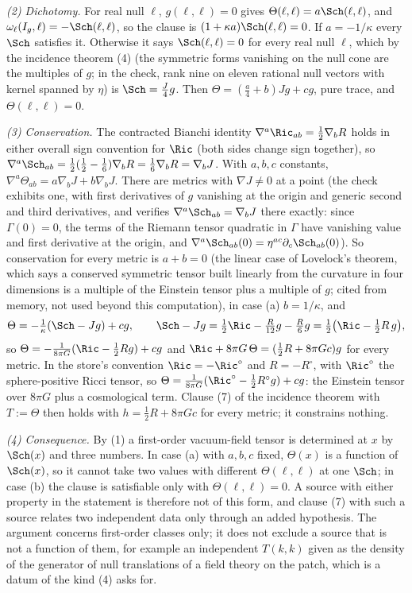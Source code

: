 \emph{(2) Dichotomy.} For real null $\ell$, $g(\ell,\ell) = 0$ gives $\Theta(\ell,\ell) = a\Sch(\ell,\ell)$, and $\omega_\ell(I_g,\ell) = -\Sch(\ell,\ell)$, so the clause is $(1 + \kappa a)\Sch(\ell,\ell) = 0$. If $a = -1/\kappa$ every $\Sch$ satisfies it. Otherwise it says $\Sch(\ell,\ell) = 0$ for every real null $\ell$, which by the incidence theorem (4) (the symmetric forms vanishing on the null cone are the multiples of $g$; in the check, rank nine on eleven rational null vectors with kernel spanned by $\eta$) is $\Sch = \tfrac{J}{4}g$. Then $\Theta = (\tfrac{a}{4} + b)Jg + cg$, pure trace, and $\Theta(\ell,\ell) = 0$.

\emph{(3) Conservation.} The contracted Bianchi identity $\nabla^a\Ric_{ab} = \tfrac12\nabla_b R$ holds in either overall sign convention for $\Ric$ (both sides change sign together), so $\nabla^a\Sch_{ab} = \tfrac12(\tfrac12 - \tfrac16)\nabla_b R = \tfrac16\nabla_b R = \nabla_b J$. With $a, b, c$ constants, $\nabla^a\Theta_{ab} = a\nabla_b J + b\nabla_b J$. There are metrics with $\nabla J \neq 0$ at a point (the check exhibits one, with first derivatives of $g$ vanishing at the origin and generic second and third derivatives, and verifies $\nabla^a\Sch_{ab} = \nabla_b J$ there exactly: since $\Gamma(0) = 0$, the terms of the Riemann tensor quadratic in $\Gamma$ have vanishing value and first derivative at the origin, and $\nabla^a\Sch_{ab}(0) = \eta^{ac}\partial_c\Sch_{ab}(0)$). So conservation for every metric is $a + b = 0$ (the linear case of Lovelock's theorem, which says a conserved symmetric tensor built linearly from the curvature in four dimensions is a multiple of the Einstein tensor plus a multiple of $g$; cited from memory, not used beyond this computation), in case (a) $b = 1/\kappa$, and
\[
\Theta = -\tfrac{1}{\kappa}(\Sch - Jg) + cg, \qquad \Sch - Jg = \tfrac12\Ric - \tfrac{R}{12}g - \tfrac{R}{6}g = \tfrac12\bigl(\Ric - \tfrac12 R\,g\bigr),
\]
so $\Theta = -\tfrac{1}{8\pi G}(\Ric - \tfrac12 Rg) + cg$ and $\Ric + 8\pi G\,\Theta = (\tfrac12 R + 8\pi G c)g$ for every metric. In the store's convention $\Ric = -\Ric^{\circ}$ and $R = -R^{\circ}$, with $\Ric^{\circ}$ the sphere-positive Ricci tensor, so $\Theta = \tfrac{1}{8\pi G}(\Ric^{\circ} - \tfrac12 R^{\circ}g) + cg$: the Einstein tensor over $8\pi G$ plus a cosmological term. Clause (7) of the incidence theorem with $T := \Theta$ then holds with $h = \tfrac12 R + 8\pi G c$ for every metric; it constrains nothing.

\emph{(4) Consequence.} By (1) a first-order vacuum-field tensor is determined at $x$ by $\Sch(x)$ and three numbers. In case (a) with $a, b, c$ fixed, $\Theta(x)$ is a function of $\Sch(x)$, so it cannot take two values with different $\Theta(\ell,\ell)$ at one $\Sch$; in case (b) the clause is satisfiable only with $\Theta(\ell,\ell) = 0$. A source with either property in the statement is therefore not of this form, and clause (7) with such a source relates two independent data only through an added hypothesis. The argument concerns first-order classes only; it does not exclude a source that is not a function of them, for example an independent $T(k,k)$ given as the density of the generator of null translations of a field theory on the patch, which is a datum of the kind (4) asks for.

